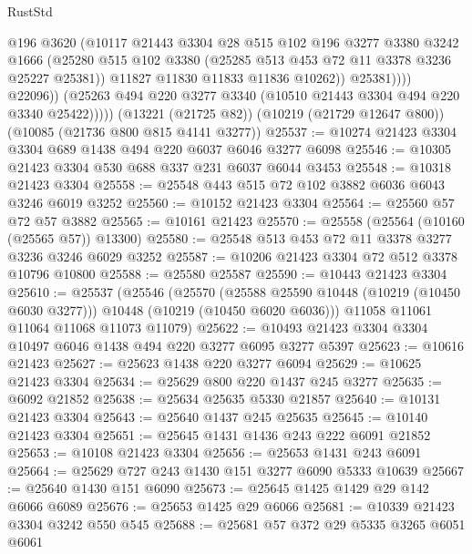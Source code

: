 \begin{lexlean}{RustStd}
\begin{coremodule}
                        @196
                        @3620
                        (@10117
                          @21443
                          @3304
                          @28
                          @515
                          @102
                          @196
                          @3277
                          @3380
                          @3242
                          @1666
                          (@25280
                            @515
                            @102
                            @3380
                            (@25285 @513 @453 @72 @11 @3378 @3236 @25227 @25381))
                          @11827
                          @11830
                          @11833
                          @11836
                          @10262))
                      @25381))))
              @22096))
          (@25263 @494 @220 @3277 @3340 (@10510 @21443 @3304 @494 @220 @3340 @25422)))))
    (@13221 (@21725 @82))
    (@10219 (@21729 @12647 @800))
    (@10085 (@21736 @800 @815 @4141 @3277))
@25537 := @10274 @21423 @3304 @3304 @689 @1438 @494 @220 @6037 @6046 @3277 @6098
@25546 := @10305 @21423 @3304 @530 @688 @337 @231 @6037 @6044 @3453
@25548 := @10318 @21423 @3304
@25558 := @25548 @443 @515 @72 @102 @3882 @6036 @6043 @3246 @6019 @3252
@25560 := @10152 @21423 @3304
@25564 := @25560 @57 @72 @57 @3882
@25565 := @10161 @21423
@25570 := @25558 (@25564 (@10160 (@25565 @57)) @13300)
@25580 := @25548 @513 @453 @72 @11 @3378 @3277 @3236 @3246 @6029 @3252
@25587 := @10206 @21423 @3304 @72 @512 @3378 @10796 @10800
@25588 := @25580 @25587
@25590 := @10443 @21423 @3304
@25610 := @25537
    (@25546
      (@25570
        (@25588 @25590 @10448 (@10219 (@10450 @6030 @3277)))
        @10448
        (@10219 (@10450 @6020 @6036)))
      @11058
      @11061
      @11064
      @11068
      @11073
      @11079)
@25622 := @10493 @21423 @3304 @3304 @10497 @6046 @1438 @494 @220 @3277 @6095 @3277 @5397
@25623 := @10616 @21423
@25627 := @25623 @1438 @220 @3277 @6094
@25629 := @10625 @21423 @3304
@25634 := @25629 @800 @220 @1437 @245 @3277
@25635 := @6092 @21852
@25638 := @25634 @25635 @5330 @21857
@25640 := @10131 @21423 @3304
@25643 := @25640 @1437 @245 @25635
@25645 := @10140 @21423 @3304
@25651 := @25645 @1431 @1436 @243 @222 @6091 @21852
@25653 := @10108 @21423 @3304
@25656 := @25653 @1431 @243 @6091
@25664 := @25629 @727 @243 @1430 @151 @3277 @6090 @5333 @10639
@25667 := @25640 @1430 @151 @6090
@25673 := @25645 @1425 @1429 @29 @142 @6066 @6089
@25676 := @25653 @1425 @29 @6066
@25681 := @10339 @21423 @3304 @3242 @550 @545
@25688 := @25681 @57 @372 @29 @5335 @3265 @6051 @6061

\end{coremodule}
\end{lexlean}
